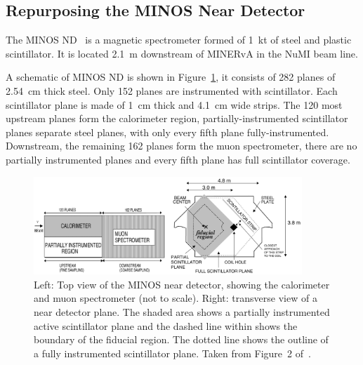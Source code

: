 \FloatBarrier
\subsection{Repurposing the MINOS Near Detector}



The MINOS ND~\cite{MINOS_NIM} is a magnetic spectrometer formed of \SI{1}{\kilo\tonne} of steel and plastic scintillator.
It is located \SI{2.1}{\metre} downstream of MINERvA in the NuMI beam line. 

A schematic of MINOS ND is shown in Figure~\ref{fig:minos_near_detector}, it consists of 282 planes of \SI{2.54}{\centi\metre} thick steel. Only 152 planes are instrumented with scintillator. Each scintillator plane is made of \SI{1}{\centi\metre} thick  and \SI{4.1}{\centi\metre} wide strips. 
The 120 most upstream planes form the calorimeter region, partially-instrumented scintillator planes separate steel planes, with only every fifth plane fully-instrumented. Downstream, the remaining 162 planes form the muon spectrometer, there are no partially instrumented planes and every fifth plane has full scintillator coverage. 

\begin{figure}[htb]
	\centering
	\includegraphics[width=0.9\textwidth]{plots/minos.png}
	\caption{Left: Top view of the MINOS near detector, showing the calorimeter and muon spectrometer (not to scale). Right: transverse view of a near detector plane. The shaded area shows a partially instrumented active scintillator plane and the dashed line within shows the boundary of the fiducial region. The dotted line shows the outline of a fully instrumented scintillator plane. Taken from Figure~2 of~\cite{MINOSDetectors}.}
	\label{fig:minos_near_detector}
\end{figure}

